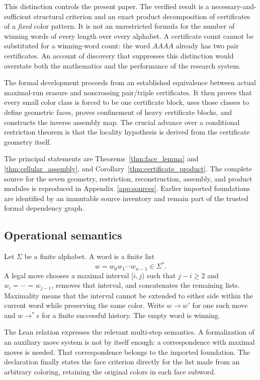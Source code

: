 \documentclass[11pt,reqno]{amsart}
\theoremstyle{definition}
\newcommand{\code}[1]{\texttt{\small\detokenize{#1}}}
\begin{document}
This distinction controls the present paper. The verified result is a necessary-and-sufficient structural criterion and an exact product decomposition of certificates of a \emph{fixed} color pattern. It is not an unrestricted formula for the number of winning words of every length over every alphabet. A certificate count cannot be substituted for a winning-word count: the word $AAAA$ already has two pair certificates. An account of discovery that suppresses this distinction would overstate both the mathematics and the performance of the research system.

The formal development proceeds from an established equivalence between actual maximal-run erasure and noncrossing pair/triple certificates. It then proves that every small color class is forced to be one certificate block, uses those classes to define geometric faces, proves confinement of heavy certificate blocks, and constructs the inverse assembly map. The crucial advance over a conditional restriction theorem is that the locality hypothesis is derived from the certificate geometry itself.

The principal statements are Theorems~\ref{thm:face_lemma} and \ref{thm:cellular_assembly}, and Corollary~\ref{thm:certificate_product}. The complete source for the seven geometry, restriction, reconstruction, assembly, and product modules is reproduced in Appendix~\ref{app:sources}. Earlier imported foundations are identified by an immutable source inventory and remain part of the trusted formal dependency graph.

\subsection{Operational semantics}
Let $\Sigma$ be a finite alphabet. A word is a finite list
\[
 w=w_0w_1\cdots w_{n-1}\in\Sigma^*.
\]
A legal move chooses a maximal interval $[i,j)$ such that $j-i\geq2$ and
$w_i=\cdots=w_{j-1}$, removes that interval, and concatenates the remaining lists.
Maximality means that the interval cannot be extended to either side within
the current word while preserving the same color. Write $w\longrightarrow w'$
for one such move and $w\longrightarrow^*\epsilon$ for a finite successful
history. The empty word is winning.

The Lean relation \code{RawMaxErases} expresses the relevant multi-step
semantics. A formalization of an auxiliary move system is not by itself enough:
a correspondence with maximal moves is needed. That correspondence belongs to
the imported foundation. The declaration
\code{raw_win_iff_heavy_face_decomposition} finally states the face criterion
directly for the list made from an arbitrary coloring, retaining the original
colors in each face subword.
\end{document}

